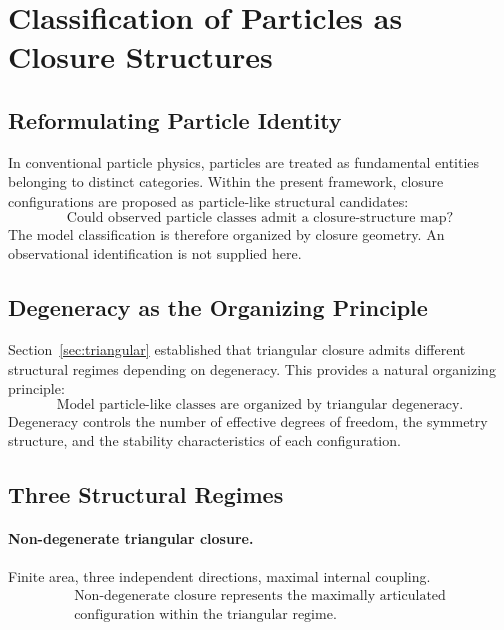 \section{Classification of Particles as Closure Structures}
\label{sec:particles}

\subsection{Reformulating Particle Identity}

In conventional particle physics, particles are treated as fundamental entities
belonging to distinct categories.
Within the present framework, closure configurations are proposed as
particle-like structural candidates:
\begin{equation}
  \boxed{
    \text{Could observed particle classes admit a closure-structure map?}
  }
\end{equation}
The model classification is therefore organized by closure geometry.  An
observational identification is not supplied here.

\subsection{Degeneracy as the Organizing Principle}

Section~\ref{sec:triangular} established that triangular closure admits
different structural regimes depending on degeneracy.
This provides a natural organizing principle:
\begin{equation}
  \boxed{\text{Model particle-like classes are organized by triangular degeneracy.}}
\end{equation}
Degeneracy controls the number of effective degrees of freedom,
the symmetry structure, and the stability characteristics of each configuration.

\subsection{Three Structural Regimes}

\paragraph{Non-degenerate triangular closure.}
Finite area, three independent directions, maximal internal coupling.
\begin{equation}
  \boxed{\begin{gathered}
    \text{Non-degenerate closure represents the maximally articulated} \\
    \text{configuration within the triangular regime.}
  \end{gathered}}
\end{equation}

